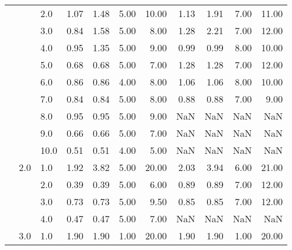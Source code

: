 \begin{tabular}{lllrrrrrrrr}
       &     & 2.0  &       1.07 &      1.48 & 5.00 &  10.00 &       1.13 &      1.91 & 7.00 &  11.00 \\
       &     & 3.0  &       0.84 &      1.58 & 5.00 &   8.00 &       1.28 &      2.21 & 7.00 &  12.00 \\
       &     & 4.0  &       0.95 &      1.35 & 5.00 &   9.00 &       0.99 &      0.99 & 8.00 &  10.00 \\
       &     & 5.0  &       0.68 &      0.68 & 5.00 &   7.00 &       1.28 &      1.28 & 7.00 &  12.00 \\
       &     & 6.0  &       0.86 &      0.86 & 4.00 &   8.00 &       1.06 &      1.06 & 8.00 &  10.00 \\
       &     & 7.0  &       0.84 &      0.84 & 5.00 &   8.00 &       0.88 &      0.88 & 7.00 &   9.00 \\
       &     & 8.0  &       0.95 &      0.95 & 5.00 &   9.00 &        NaN &       NaN &  NaN &    NaN \\
       &     & 9.0  &       0.66 &      0.66 & 5.00 &   7.00 &        NaN &       NaN &  NaN &    NaN \\
       &     & 10.0 &       0.51 &      0.51 & 4.00 &   5.00 &        NaN &       NaN &  NaN &    NaN \\
       & 2.0 & 1.0  &       1.92 &      3.82 & 5.00 &  20.00 &       2.03 &      3.94 & 6.00 &  21.00 \\
       &     & 2.0  &       0.39 &      0.39 & 5.00 &   6.00 &       0.89 &      0.89 & 7.00 &  12.00 \\
       &     & 3.0  &       0.73 &      0.73 & 5.00 &   9.50 &       0.85 &      0.85 & 7.00 &  12.00 \\
       &     & 4.0  &       0.47 &      0.47 & 5.00 &   7.00 &        NaN &       NaN &  NaN &    NaN \\
       & 3.0 & 1.0  &       1.90 &      1.90 & 1.00 &  20.00 &       1.90 &      1.90 & 1.00 &  20.00 \\
\bottomrule
\end{tabular}
